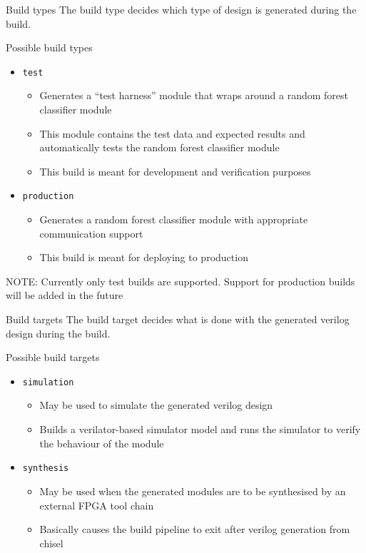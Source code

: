 \documentclass[presentation]{beamer}
\begin{document}
\begin{frame}[label={sec:org009e90e},fragile]{Build types}
 The build type decides which type of design is generated during the build.

\begin{block}{Possible build types}
\begin{itemize}
\item \texttt{test}
\begin{itemize}
\item Generates a ``test harness'' module that wraps around a random forest classifier module
\item This module contains the test data and expected results and automatically tests the random forest classifier module
\item This build is meant for development and verification purposes
\end{itemize}

\item \texttt{production}
\begin{itemize}
\item Generates a random forest classifier module with appropriate communication support
\item This build is meant for deploying to production
\end{itemize}
\end{itemize}

\alert{NOTE: Currently only test builds are supported. Support for production builds will be added in the future}
\end{block}
\end{frame}

\begin{frame}[label={sec:orgd2ea943},fragile]{Build targets}
 The build target decides what is done with the generated verilog design during the build.

\begin{block}{Possible build targets}
\begin{itemize}
\item \texttt{simulation}
\begin{itemize}
\item May be used to simulate the generated verilog design
\item Builds a verilator-based simulator model and runs the simulator to verify the behaviour of the module
\end{itemize}

\item \texttt{synthesis}
\begin{itemize}
\item May be used when the generated modules are to be synthesised by an external FPGA tool chain
\item Basically causes the build pipeline to exit after verilog generation from chisel
\end{itemize}
\end{itemize}
\end{block}
\end{frame}
\end{document}
